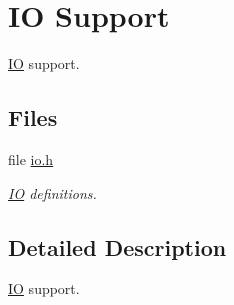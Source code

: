 \hypertarget{group__lm3s69xx__io}{}\section{IO Support}
\label{group__lm3s69xx__io}


\mbox{\hyperlink{structIO}{IO}} support.  


\subsection*{Files}
\begin{DoxyCompactItemize}
\item 
file \mbox{\hyperlink{bsps_2arm_2lm3s69xx_2include_2bsp_2io_8h}{io.\+h}}
\begin{DoxyCompactList}\small\item\em \mbox{\hyperlink{structIO}{IO}} definitions. \end{DoxyCompactList}\end{DoxyCompactItemize}


\subsection{Detailed Description}
\mbox{\hyperlink{structIO}{IO}} support. 

